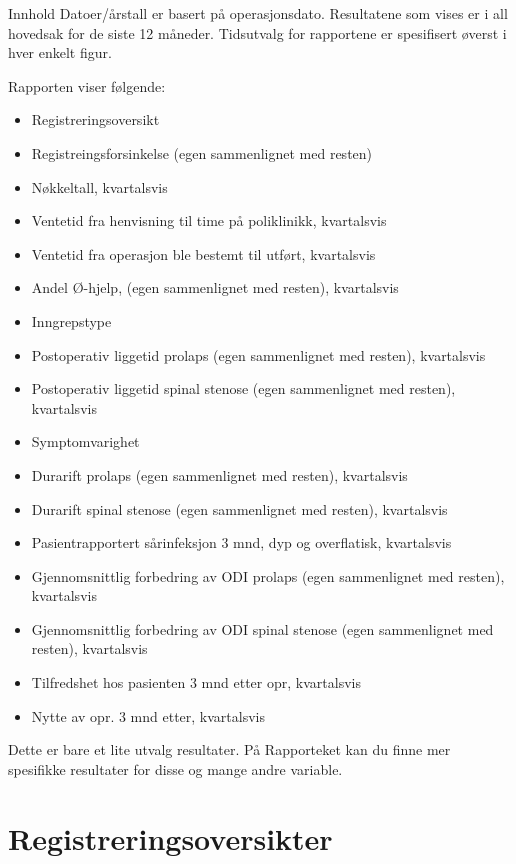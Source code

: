 \documentclass[handout, xcolor=pdftex,dvipsnames,table]{beamer}  %
\begin{document}
\begin{tiny}
\begin{frame}[fragile] {Innhold}
Datoer/årstall er basert på operasjonsdato. Resultatene som vises er i all hovedsak for de siste 12 måneder.
Tidsutvalg for rapportene er spesifisert øverst i hver enkelt figur.

Rapporten viser følgende:
\begin{itemize}
\item Registreringsoversikt
\item Registreingsforsinkelse (egen sammenlignet med resten)
\item Nøkkeltall, kvartalsvis
\item Ventetid fra henvisning til time på poliklinikk, kvartalsvis
\item Ventetid fra operasjon ble bestemt til utført, kvartalsvis
\item Andel Ø-hjelp, (egen sammenlignet med resten), kvartalsvis
\item Inngrepstype
\item Postoperativ liggetid prolaps (egen sammenlignet med resten), kvartalsvis
\item Postoperativ liggetid spinal stenose (egen sammenlignet med resten), kvartalsvis
\item Symptomvarighet
\item Durarift prolaps (egen sammenlignet med resten), kvartalsvis
\item Durarift spinal stenose (egen sammenlignet med resten), kvartalsvis
\item Pasientrapportert sårinfeksjon 3 mnd, dyp og overflatisk, kvartalsvis
\item Gjennomsnittlig forbedring av ODI prolaps (egen sammenlignet med resten), kvartalsvis
\item Gjennomsnittlig forbedring av ODI spinal stenose (egen sammenlignet med resten), kvartalsvis
\item Tilfredshet hos pasienten 3 mnd etter opr, kvartalsvis
\item Nytte av opr. 3 mnd etter, kvartalsvis
\end{itemize}

Dette er bare et lite utvalg resultater. På Rapporteket kan du finne mer spesifikke resultater for disse og mange andre variable.

\end{frame}


\section{Registreringsoversikter}


\end{tiny}
\end{document}
